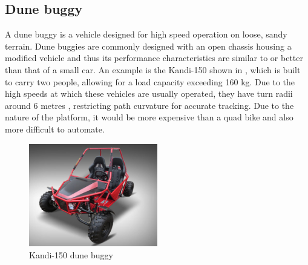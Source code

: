 \documentclass[main.tex]{subfiles}
\begin{document}
\begin{appendices}
\section{Dune buggy}
A dune buggy is a vehicle designed for high speed operation on loose, sandy terrain. Dune buggies are commonly designed with an open chassis housing a modified vehicle and thus its performance characteristics are similar to or better than that of a small car. An example is the Kandi-150 shown in , which is built to carry two people, allowing for a load capacity exceeding 160 kg. Due to the high speeds at which these vehicles are usually operated, they have turn radii around 6 metres \parencite{150GKM}, restricting path curvature for accurate tracking. Due to the nature of the platform, it would be more expensive than a quad bike and also more difficult to automate.
\begin{figure}[ht]
\includegraphics[width=0.5\textwidth]{8-Appendices/kandidunebuggy.jpg}
\centering
\caption[Kandi-150 dune buggy]{Kandi-150 dune buggy \parencite{150GKM}} 
\end{figure}


\end{appendices}
\end{document}

